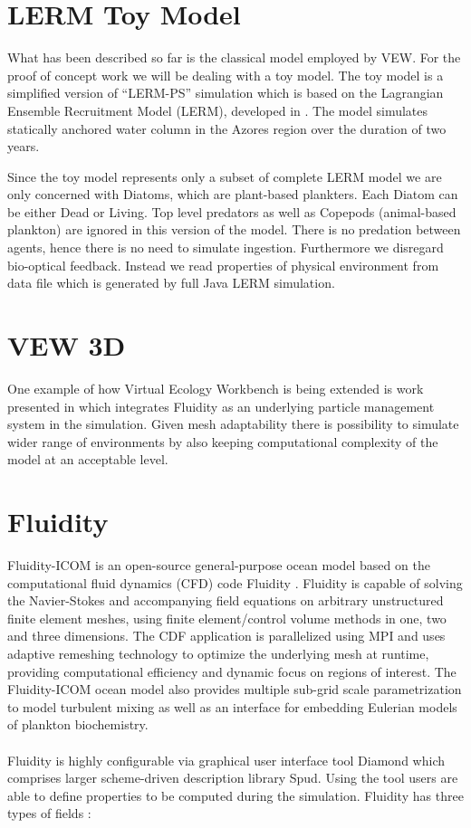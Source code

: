 \documentclass[12pt, a4paper]{report}
\begin{document}
\section{LERM Toy Model}\label{subsec:lermtm}
What has been described so far is the classical model employed by VEW. For the proof of concept work
we will be dealing with a toy model. The toy model is a simplified version of ``LERM-PS'' simulation which
is based on the Lagrangian Ensemble Recruitment Model (LERM), developed in \cite{FisheriesRecruitment}.
The model simulates statically anchored water column in the Azores region over the duration of two years.

Since the toy model represents only a subset of complete LERM model we are only concerned with Diatoms, which
are plant-based plankters. Each Diatom can be either Dead or Living. Top level predators as well as Copepods (animal-based plankton)
are ignored in this version of the model. There is no predation between agents, hence there is no need to simulate
ingestion. Furthermore we disregard bio-optical feedback. Instead we read properties of physical environment
from data file which is generated by full Java LERM simulation.

\section{VEW 3D}\label{subsec:vew3d}
One example of how Virtual Ecology Workbench is being extended is work presented in \cite{FluidityVEW}
which integrates Fluidity as an underlying particle management system in the simulation. Given
mesh adaptability there is possibility to simulate wider range of environments by also keeping computational
complexity of the model at an acceptable level.

\section{Fluidity}\label{sec:fluidity}
Fluidity-ICOM is an open-source general-purpose ocean model based on
the computational fluid dynamics (CFD) code Fluidity \cite{Piggot2008,fluidity}. Fluidity is
capable of solving the Navier-Stokes and accompanying field equations on
arbitrary unstructured finite element meshes, using finite element/control
volume methods in one, two and three dimensions. The CDF application is
parallelized using MPI and uses adaptive remeshing technology to optimize
the underlying mesh at runtime, providing computational efficiency and
dynamic focus on regions of interest. The Fluidity-ICOM ocean model
also provides multiple sub-grid scale parametrization to model turbulent
mixing as well as an interface for embedding Eulerian models of plankton
biochemistry.
\\\\
Fluidity is highly configurable via graphical user interface tool Diamond
which comprises larger scheme-driven description library Spud\cite{ham2009spud}. Using the tool
users are able to define properties to be computed during the simulation.
Fluidity has three types of fields \cite{fluidity}:
\end{document}
